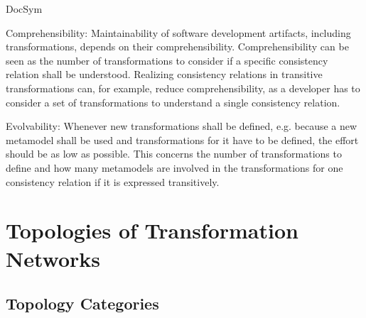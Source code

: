 \begin{copiedFrom}{DocSym}
\begin{properdescription}
\item[Comprehensibility:]
Maintainability of software development artifacts, including transformations, depends on their comprehensibility.
Comprehensibility can be seen as the number of transformations to consider if a specific consistency relation shall be understood.
Realizing consistency relations in transitive transformations can, for example, reduce comprehensibility, as a developer has to consider a set of transformations to understand a single consistency relation. 

\item[Evolvability:]
Whenever new transformations shall be defined, e.g. because a new metamodel shall be used and transformations for it have to be defined, the effort should be as low as possible.
This concerns the number of transformations to define and how many metamodels are involved in the transformations for one consistency relation if it is expressed transitively.
\end{properdescription}


\end{copiedFrom} %


\section{Topologies of Transformation Networks}

\subsection{Topology Categories}

